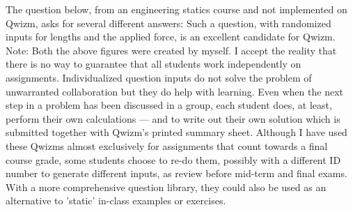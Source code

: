 \documentclass{tufte-handout}
\begin{document}
\parb
The question below, from an engineering statics course and not implemented on Qwizm, asks for several different answers:
\parb
Such a question, with randomized inputs for lengths and the applied force, is an excellent candidate for Qwizm.
\parb
Note: Both the above figures were created by myself.
\parb
I accept the reality that there is no way to guarantee that all students work independently on assignments. Individualized question inputs do not solve the problem of unwarranted collaboration but they do help with learning. Even when the next step in a problem has been discussed in a group, each student does, at least, perform their own calculations --- and to write out their own solution which is submitted together with Qwizm's printed summary sheet.
\parm
Although I have used these Qwizms almost exclusively for assignments that count towards a final course grade, some students choose to re-do them, possibly with a different ID number to generate different inputs, as review before mid-term and final exams. With a more comprehensive question library, they could also be used as an alternative to 'static' in-class examples or exercises.
\parm
\end{document}
